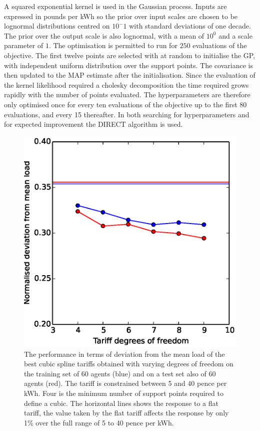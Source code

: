 \documentclass[a4paper, 10 pt, conference]{ieeeconf}  %
\begin{document}
A squared exponential kernel is used in the Gaussian process. Inputs are expressed in pounds per kWh so the  prior over input scales are chosen to be lognormal distributions centred on $10^-1$ with standard deviations of one decade. The prior over the output scale is also lognormal, with a mean of $10^0$ and a scale parameter of $1$. The optimisation is permitted to run for $250$ evaluations of the objective. The first twelve points are selected with at random to initialise the GP, with independent uniform distribution over the support points. The covariance is then updated to the MAP estimate after the initialisation. Since the evaluation of the kernel likelihood required a cholesky decomposition the time required grows rapidly with the number of points evaluated. The hyperparameters are therefore only optimised once for every ten evaluations of the objective up to the first 80 evaluations, and every 15 thereafter. In both searching for hyperparameters and for expected improvement the DIRECT algorithm is used.

\begin{figure}[htb]
\centering
\includegraphics[width=\columnwidth,trim =0cm 0cm 0cm 0cm,clip=True]{f2.eps}
\caption{The performance in terms of deviation from the mean load of the best cubic spline tariffs obtained with varying degrees of freedom on the training set of 60 agents (blue) and on a test set also of 60 agents (red). The tariff is constrained between 5 and 40 pence per kWh. Four is the minimum number of support points required to define a cubic. The horizontal lines shows the response to a flat tariff, the value taken by the flat tariff affects the response by only 1\% over the full range of 5 to 40 pence per kWh.}
\label{DOFplot}
\end{figure}
\end{document}
